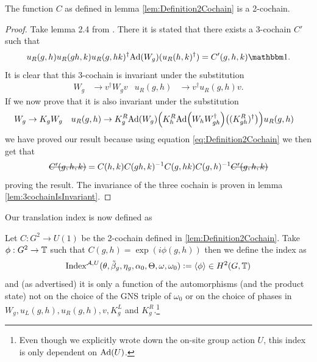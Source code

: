\documentclass[11pt,a4paper,twoside]{article}
\numberwithin{equation}{section}
\begin{document}
	\begin{lemma}
		The function $C$ as defined in lemma \ref{lem:Definition2Cochain} is a 2-cochain.
	\end{lemma}
	\begin{proof}
		Take lemma 2.4 from \cite{ogata2021h3gmathbb}. There it is stated that there exists a 3-cochain $C'$ such that
		\begin{equation}\label{eq:defintion3CochainProof2Cochain}
			u_R(g,h)u_R(gh,k)u_R(g,hk)^\dagger\Ad{W_g}(u_R(h,k)^\dagger)=C'(g,h,k)\id.
		\end{equation}
		It is clear that this 3-cochain is invariant under the substitution
		\begin{align}
			W_g&\rightarrow v^\dagger W_g v&u_R(g,h)&\rightarrow v^\dagger u_R(g,h)v.
		\end{align}
		If we now prove that it is also invariant under the substitution
		\begin{align}\label{eq:SubstitutionForProofCochain}
			W_g&\rightarrow K_g W_g&u_R(g,h)&\rightarrow K_g^R\Ad{W_g}\left(K_h^R\Ad{W_hW_{gh}^\dagger}\left((K_{gh}^R)^\dagger\right)\right)u_
			R(g,h)
		\end{align}
		we have proved our result because using equation \eqref{eq:Definition2Cochain} we then get that
		\begin{equation}
			\stkout{C'(g,h,k)}=C(h,k)C(gh,k)^{-1}C(g,hk)C(g,h)^{-1}\stkout{C'(g,h,k)}
		\end{equation}
		proving the result. The invariance of the three cochain is proven in lemma \ref{lem:3cochainIsInvariant}.
	\end{proof}
	Our translation index is now defined as
	\begin{definition}\label{def:DefinitionOfTheH2ValuedIndex}
		Let $C:G^2\rightarrow U(1)$ be the 2-cochain defined in \ref{lem:Definition2Cochain}. Take $\phi:G^2\rightarrow\mathbb T$ such that $C(g,h)=\exp(i\phi(g,h))$ then we define the index as
		\begin{equation}
			\textrm{Index}^{\mathcal A,U}(\theta,\tilde{\beta}_g,\eta_g,\alpha_0,\Theta,\omega,\omega_0)\vcentcolon=\expval{\phi}\in H^2(G,\mathbb T)
		\end{equation}
		and (as advertised) it is only a function of the automorphisms (and the product state) not on the choice of the GNS triple of $\omega_0$ or on the choice of phases in $W_g,u_L(g,h),u_R(g,h),v,K_g^L$ and $K_g^R$.\footnote{Even though we explicitly wrote down the on-site group action $U$, this index is only dependent on $\Ad{U}$.}
	\end{definition}
\end{document}
